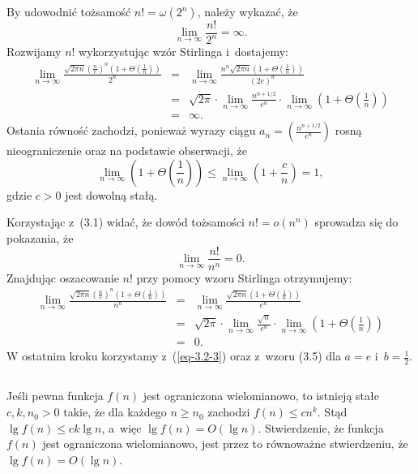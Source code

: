 By udowodnić tożsamość $n!=\omega(2^n)$, należy wykazać, że
\[
	\lim_{n\to\infty}\frac{n!}{2^n}=\infty.
\]
Rozwijamy $n!$ wykorzystując wzór Stirlinga i~dostajemy:
\begin{eqnarray*}
	\lim_{n\to\infty}\frac{\sqrt{2\pi n}\left(\frac{n}{e}\right)^n\left(1+\Theta\left(\frac{1}{n}\right)\right)}{2^n} &=& \lim_{n\to\infty}\frac{n^n\sqrt{2\pi n}\left(1+\Theta\left(\frac{1}{n}\right)\right)}{(2e)^n} \\
	&=& \sqrt{2\pi}\cdot\lim_{n\to\infty}\frac{n^{n+1/2}}{e^n}\cdot\lim_{n\to\infty}\left(1+\Theta\left(\frac{1}{n}\right)\right) \\
	&=& \infty.
\end{eqnarray*}
Ostania równość zachodzi, ponieważ wyrazy ciągu $a_n=\left(\frac{n^{n+1/2}}{e^n}\right)$ rosną nieograniczenie oraz na podstawie obserwacji, że
\begin{equation}\label{eq-3.2-3}
  \lim_{n\to\infty}\left(1+\Theta\left(\frac{1}{n}\right)\right)\le \lim_{n\to\infty}\left(1+\frac{c}{n}\right)=1,
\end{equation}
gdzie $c>0$ jest dowolną stałą.

Korzystając z~(3.1) widać, że dowód tożsamości $n!=o(n^n)$ sprowadza się do pokazania, że
\[
	\lim_{n\to\infty}\frac{n!}{n^n}=0.
\]
Znajdując oszacowanie $n!$ przy pomocy wzoru Stirlinga otrzymujemy:
\begin{eqnarray*}
	\lim_{n\to\infty}\frac{\sqrt{2\pi n}\left(\frac{n}{e}\right)^n\left(1+\Theta\left(\frac{1}{n}\right)\right)}{n^n} &=& \lim_{n\to\infty}\frac{\sqrt{2\pi n}\left(1+\Theta\left(\frac{1}{n}\right)\right)}{e^n} \\
	&=& \sqrt{2\pi}\cdot\lim_{n\to\infty}\frac{\sqrt{n}}{e^n}\cdot\lim_{n\to\infty}\left(1+\Theta\left(\frac{1}{n}\right)\right) \\
	&=& 0.
\end{eqnarray*}
W ostatnim kroku korzystamy z~(\ref{eq-3.2-3}) oraz z~wzoru (3.5) dla $a=e$ i~$b=\frac{1}{2}$.

\subsection{} %
Jeśli pewna funkcja $f(n)$ jest ograniczona wielomianowo, to istnieją stałe $c,k,n_0>0$ takie, że dla każdego $n\ge n_0$ zachodzi $f(n)\le cn^k$. Stąd $\lg f(n)\le ck\lg n$, a~więc $\lg f(n)=O(\lg n)$. Stwierdzenie, że funkcja $f(n)$ jest ograniczona wielomianowo, jest przez to  równoważne stwierdzeniu, że $\lg f(n)=O(\lg n)$.

